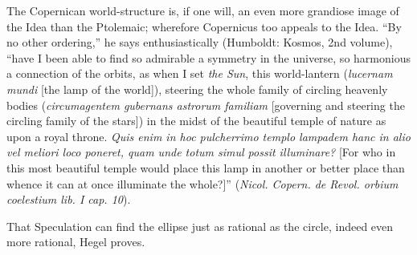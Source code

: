 \documentclass[12pt]{book}
\begin{document}
The Copernican world-structure is, if one will, an even more grandiose image of the Idea than the Ptolemaic;
wherefore Copernicus too appeals to the Idea. ``By no other ordering,'' he says enthusiastically (Humboldt:
Kosmos, 2nd volume), ``have I been able to find so admirable a symmetry in the universe, so harmonious a
connection of the orbits, as when I set \emph{the Sun}, this world-lantern (\textit{lucernam mundi} [the
lamp of the world]), steering the whole family of circling heavenly bodies (\textit{circumagentem gubernans
astrorum familiam} [governing and steering the circling family of the stars]) in the midst of the beautiful
temple of nature as upon a royal throne. \textit{Quis enim in hoc pulcherrimo templo lampadem hanc in alio
vel meliori loco poneret, quam unde totum simul possit illuminare?} [For who in this most beautiful temple
would place this lamp in another or better place than whence it can at once illuminate the whole?]''
(\textit{Nicol. Copern. de Revol. orbium coelestium lib. I cap. 10}).

That Speculation can find the ellipse just as rational as the circle, indeed even more rational, Hegel
proves.
\end{document}
